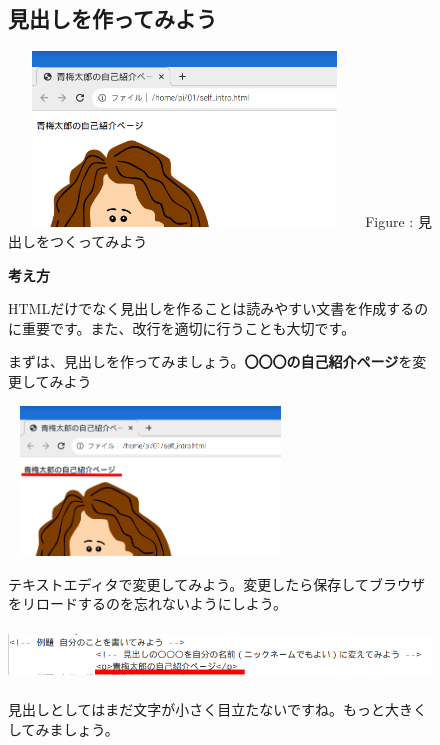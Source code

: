 \documentclass[a4paper,12pt]{jarticle}
\begin{document}
\vfill
\clearpage
\begin{figure}[ht]
  \subsection{\theExercise 見出しを作ってみよう}


  \centering
  \begin{minipage}{9.327cm}
    {\upshape
      \includegraphics[width=9.327cm,height=4.662cm]{textbook-img153.png}
      \newline
      Figure : 見出しをつくってみよう}
  \end{minipage}


  \bigskip
  \flushleft

  \textbf{考え方}



  \begin{minipage}{16.576cm}
    \flushleft

    HTMLだけでなく見出しを作ることは読みやすい文書を作成するのに重要です。また、改行を適切に行うことも大切です。

    まずは、見出しを作ってみましょう。\textbf{〇〇〇の自己紹介ページ}を変更してみよう


    \bigskip

    \includegraphics[width=7.544cm,height=3.981cm]{textbook-img154.png}


    \bigskip

    テキストエディタで変更してみよう。変更したら保存してブラウザをリロードするのを忘れないようにしよう。


    \bigskip

    \includegraphics[width=14.907cm,height=1.423cm]{textbook-img155.png}


    \bigskip


    見出しとしてはまだ文字が小さく目立たないですね。もっと大きくしてみましょう。




    \bigskip
  \end{minipage}

\end{figure}
\end{document}
